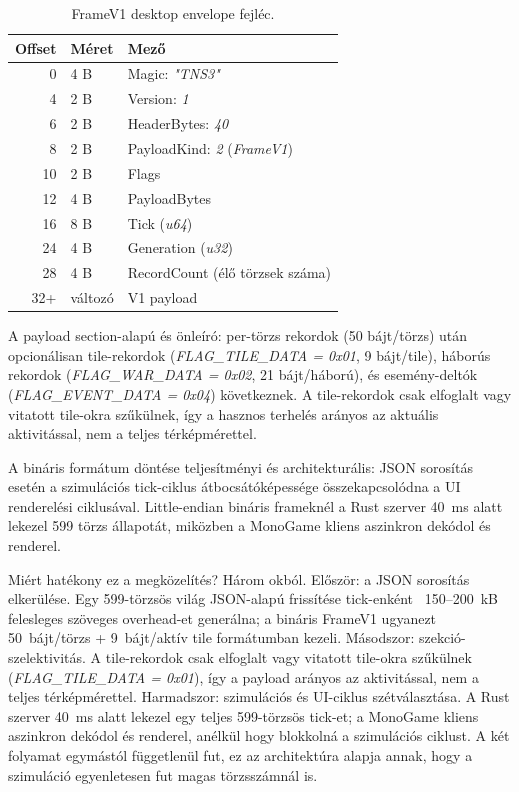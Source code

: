 \begin{table}[h]
\centering
\caption{FrameV1 desktop envelope fejléc.}
\label{tab:framev1-envelope}
\begin{tabular}{rll}
\hline
\textbf{Offset} & \textbf{Méret} & \textbf{Mező} \\
\hline
0  & 4 B & Magic: \textit{"TNS3"} \\
4  & 2 B & Version: \textit{1} \\
6  & 2 B & HeaderBytes: \textit{40} \\
8  & 2 B & PayloadKind: \textit{2} (\textit{FrameV1}) \\
10 & 2 B & Flags \\
12 & 4 B & PayloadBytes \\
16 & 8 B & Tick (\textit{u64}) \\
24 & 4 B & Generation (\textit{u32}) \\
28 & 4 B & RecordCount (élő törzsek száma) \\
32+ & változó & V1 payload \\
\hline
\end{tabular}
\end{table}

A payload section-alapú és önleíró: per-törzs rekordok (50 bájt/törzs)
után opcionálisan tile-rekordok (\textit{FLAG\_TILE\_DATA = 0x01}, 9 bájt/tile),
háborús rekordok (\textit{FLAG\_WAR\_DATA = 0x02}, 21 bájt/háború),
és esemény-deltók (\textit{FLAG\_EVENT\_DATA = 0x04}) következnek.
A tile-rekordok csak elfoglalt vagy vitatott tile-okra szűkülnek,
így a hasznos terhelés arányos az aktuális aktivitással, nem a teljes térképmérettel.

A bináris formátum döntése teljesítményi és architekturális: JSON sorosítás esetén
a szimulációs tick-ciklus átbocsátóképessége összekapcsolódna a UI renderelési
ciklusával. Little-endian bináris frameknél a Rust szerver 40~ms alatt
lekezel 599 törzs állapotát, miközben a MonoGame kliens aszinkron dekódol és renderel.

Miért hatékony ez a megközelítés? Három okból. Először: a JSON sorosítás elkerülése.
Egy 599-törzsös világ JSON-alapú frissítése tick-enként ~150--200~kB felesleges szöveges
overhead-et generálna; a bináris FrameV1 ugyanezt 50~bájt/törzs + 9~bájt/aktív tile
formátumban kezeli. Másodszor: szekció-szelektivitás. A tile-rekordok csak elfoglalt
vagy vitatott tile-okra szűkülnek (\textit{FLAG\_TILE\_DATA = 0x01}), így a payload
arányos az aktivitással, nem a teljes térképmérettel. Harmadszor: szimulációs és
UI-ciklus szétválasztása. A Rust szerver 40~ms alatt lekezel egy teljes 599-törzsös
tick-et; a MonoGame kliens aszinkron dekódol és renderel, anélkül hogy blokkolná a
szimulációs ciklust. A két folyamat egymástól függetlenül fut, ez az architektúra
alapja annak, hogy a szimuláció egyenletesen fut magas törzsszámnál is.


